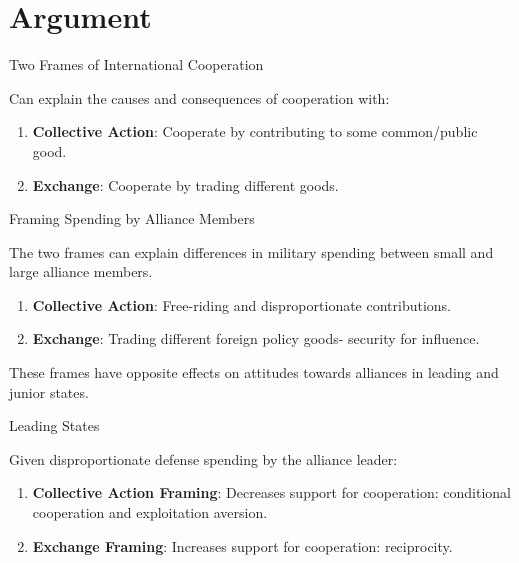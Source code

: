 \documentclass[12pt]{beamer}
\begin{document}

\section{Argument} 


\begin{frame}{Two Frames of International Cooperation}

Can explain the causes and consequences of cooperation with:

\pause 
\begin{enumerate} 
\item \textbf{Collective Action}: Cooperate by contributing to some common/public good. 
\pause 
\item \textbf{Exchange}: Cooperate by trading different goods. 
\end{enumerate}


\end{frame} 


\begin{frame}{Framing Spending by Alliance Members}

The two frames can explain differences in military spending between small and large alliance members. 

\pause 
\begin{enumerate} 
\item \textbf{Collective Action}: Free-riding and disproportionate contributions. 
\pause 
\item \textbf{Exchange}: Trading different foreign policy goods- security for influence. 
\end{enumerate}


\end{frame} 


\begin{frame}[standout]

These frames have opposite effects on attitudes towards alliances in leading and junior states. 

\end{frame} 


\begin{frame}{Leading States}

Given disproportionate defense spending by the alliance leader:  
\pause 
\begin{enumerate} 
\item \textbf{Collective Action Framing}: Decreases support for cooperation: conditional cooperation and exploitation aversion. 
\pause 
\item \textbf{Exchange Framing}: Increases support for cooperation: reciprocity. 
\end{enumerate}


\end{frame} 
\end{document}

